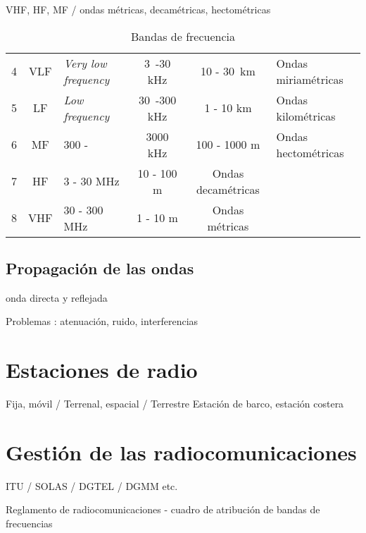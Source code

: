 VHF, HF, MF / ondas métricas, decamétricas, hectométricas
%
\begin{table}[htdp]
\caption{Bandas de frecuencia}
\begin{center}
\begin{tabular}{cclccl}

4& VLF & \textit{Very low frequency} &   3~-30 kHz  & 10 - 30~km & Ondas miriamétricas\\
5& LF   & \textit{Low frequency}         & 30~-300 kHz &  1 - 10 km   & Ondas kilométricas\\ 
6 &MF  & 300 - &3000 kHz & 100 - 1000 m & Ondas hectométricas\\
7 &HF  & 3 - 30 MHz & 10 - 100 m & Ondas decamétricas\\
8 &VHF & 30 - 300 MHz & 1 - 10 m  & Ondas métricas\\
\hline
\end{tabular}
\end{center}
\label{tb:bandas}
\end{table}%



\subsection{Propagación de las ondas}

onda directa y reflejada

Problemas : atenuación, ruido, interferencias

\section{Estaciones de radio}

Fija, móvil / 
Terrenal, espacial /
Terrestre
Estación de barco, estación costera

\section{Gestión de las radiocomunicaciones}

ITU / SOLAS / DGTEL / DGMM etc.

Reglamento de radiocomunicaciones - cuadro de atribución de bandas de frecuencias
